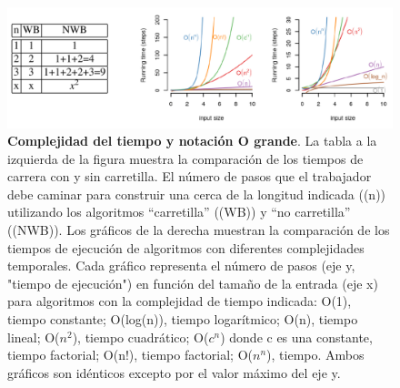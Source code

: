 \begin{figure}[htbp]
\centering
\includegraphics[width = \textwidth]{figs/big-o.png}
\caption{\textbf{Complejidad del tiempo y notación O grande}. La tabla a la izquierda de la figura muestra la comparación de los tiempos de carrera con y sin carretilla. El número de pasos que el trabajador debe caminar para construir una cerca de la longitud indicada ((n)) utilizando los algoritmos “carretilla” ((WB)) y “no carretilla” ((NWB)). Los gráficos de la derecha muestran la comparación de los tiempos de ejecución de algoritmos con diferentes complejidades temporales. Cada gráfico representa el número de pasos (eje y, "tiempo de ejecución") en función del tamaño de la entrada (eje x) para algoritmos con la complejidad de tiempo indicada: O(1), tiempo constante; O(log(n)), tiempo logarítmico; O(n), tiempo lineal; O($n^2$), tiempo cuadrático; O($c^n$) donde c es una constante, tiempo factorial; O(n!), tiempo factorial; O($n^n$), tiempo. Ambos gráficos son idénticos excepto por el valor máximo del eje y.}
\label{fig:big-O}
\end{figure}

